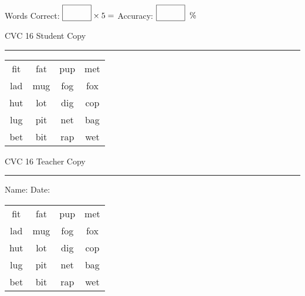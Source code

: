 \documentclass{memoir}
\begin{document}
\normalsize

Words Correct: $\fbox{\phantom{\huge 100}} \times 5 = $ Accuracy: $\fbox{\phantom{\huge 100}}\;\; \%$ 

\vfill

\newpage


\footnotesize \noindent
CVC 16 \hfill Student Copy
\smallskip
\hrule

\huge

\setlength{\tabcolsep}{14pt}
\def\arraystretch{2}

{\selectfont


\begin{vplace}[0.5]
\begin{center}
\begin{tabular}{cccc}
fit & fat & pup & met \\
lad & mug & fog & fox \\
hut & lot & dig & cop \\
lug & pit & net & bag \\
bet & bit & rap & wet \\
\end{tabular}
\end{center}
\end{vplace}

}

\newpage

\footnotesize \noindent
CVC 16 \hfill Teacher Copy
\smallskip
\hrule

\normalsize

\vfill

\noindent
Name: \underline{\hspace{1.75in}} \hfill Date: \underline{\hspace{1in}}

\huge

{\selectfont


\begin{vplace}[0.5]
\begin{center}
\begin{tabular}{cccc}
fit & fat & pup & met \\
lad & mug & fog & fox \\
hut & lot & dig & cop \\
lug & pit & net & bag \\
bet & bit & rap & wet \\
\end{tabular}
\end{center}
\end{vplace}



}
\end{document}
